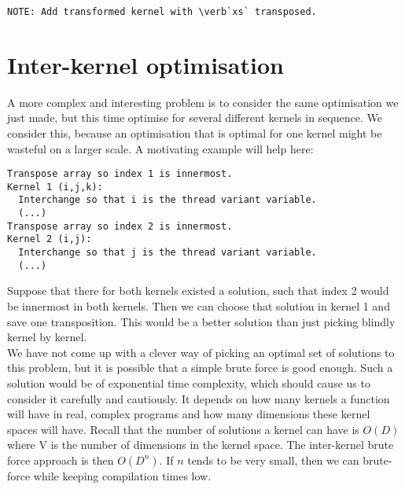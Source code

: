 \documentclass{article}
\begin{document}
\begin{verbatim}
NOTE: Add transformed kernel with \verb`xs` transposed.
\end{verbatim}

\section{Inter-kernel optimisation}

A more complex and interesting problem is to consider the same optimisation we just made, but this time optimise for several different kernels in sequence. We
consider this, because an optimisation that is optimal for one kernel might be wasteful on a larger scale. A motivating example will help here:

\begin{verbatim}
Transpose array so index 1 is innermost.
Kernel 1 (i,j,k):
  Interchange so that i is the thread variant variable.
  (...)
Transpose array so index 2 is innermost.
Kernel 2 (i,j):
  Interchange so that j is the thread variant variable.
  (...)
\end{verbatim}

Suppose that there for both kernels existed a solution, such that index 2 would be innermost in both kernels. Then we can choose that solution in kernel 1 and
save one transposition. This would be a better solution than just picking blindly kernel by kernel.\\

We have not come up with a clever way of picking an optimal set of solutions to this problem, but it is possible that a simple brute force is good enough. Such
a solution would be of exponential time complexity, which should cause us to consider it carefully and cautiously. It depends on how many kernels a function
will have in real, complex programs and how many dimensions these kernel spaces will have. Recall that the number of solutions a kernel can have is $O(D)$ where
V is the number of dimensions in the kernel space. The inter-kernel brute force approach is then $O(D^n)$. If $n$ tends to be very small, then we can
brute-force while keeping compilation times low.
\end{document}
